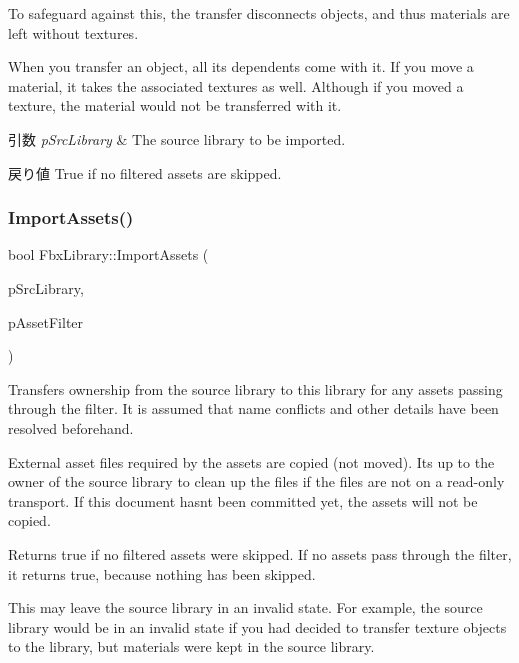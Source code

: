 To safeguard against this, the transfer disconnects objects, and thus materials are left without textures.

When you transfer an object, all its dependents come with it. If you move a material, it takes the associated textures as well. Although if you moved a texture, the material would not be transferred with it. 
\begin{DoxyParams}{引数}
{\em p\+Src\+Library} & The source library to be imported. \\
\hline
\end{DoxyParams}
\begin{DoxyReturn}{戻り値}
{\ttfamily True} if no filtered assets are skipped. 
\end{DoxyReturn}
\mbox{\label{class_fbx_library_a2970dc9bde3b76130571ad959cd58389}} 
\subsubsection{\texorpdfstring{Import\+Assets()}{ImportAssets()}\hspace{0.1cm}{\footnotesize\ttfamily [2/2]}}
{\footnotesize\ttfamily bool Fbx\+Library\+::\+Import\+Assets (\begin{DoxyParamCaption}\item[{\hyperlink{class_fbx_library}{Fbx\+Library} $\ast$}]{p\+Src\+Library,  }\item[{const \hyperlink{class_fbx_criteria}{Fbx\+Criteria} \&}]{p\+Asset\+Filter }\end{DoxyParamCaption})}

Transfers ownership from the source library to this library for any assets passing through the filter. It is assumed that name conflicts and other details have been resolved beforehand.

External asset files required by the assets are copied (not moved). It\textquotesingle{}s up to the owner of the source library to clean up the files if the files are not on a read-\/only transport. If this document hasn\textquotesingle{}t been committed yet, the assets will not be copied.

Returns true if no filtered assets were skipped. If no assets pass through the filter, it returns true, because nothing has been skipped.

This may leave the source library in an invalid state. For example, the source library would be in an invalid state if you had decided to transfer texture objects to the library, but materials were kept in the source library.

